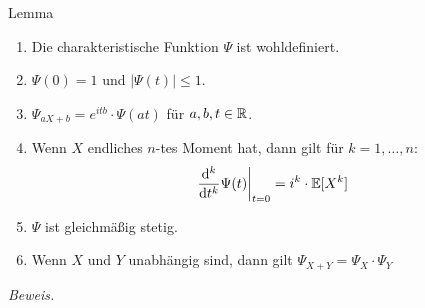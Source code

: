 \begin{colbox}{Lemma}\label{lem:charEigenschaften}
    \begin{enumerate}
        \item Die charakteristische Funktion $\Psi$ ist wohldefiniert.
        \item $\Psi(0)=1$ und $|\Psi(t)|\leq 1$.
        \item $\Psi_{aX+b} = e^{itb}\cdot\Psi(at)$ für $a,b,t\in\mathbb R$.
        \item Wenn $X$ endliches $n$-tes Moment hat, dann gilt für $k=1,\dots,n$:
        \[
            \left.\dfrac{\mathop{}\!\mathrm{d}^k}{\mathop{}\!\mathrm{d} t^k} \Psi(t)\right|_{t=0} = i^k\cdot \mathbb E[X^k]
        \]
        \item $\Psi$ ist gleichmäßig stetig.
        \item Wenn $X$ und $Y$ unabhängig sind, dann gilt $\Psi_{X+Y} = \Psi_X\cdot\Psi_Y$
    \end{enumerate}
\end{colbox}
\textit{Beweis.}
